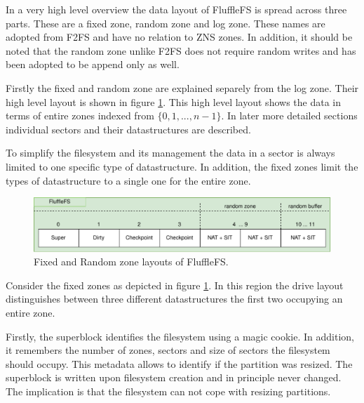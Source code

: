 In a very high level overview the data layout of FluffleFS is spread across
three parts. These are a fixed zone, random zone and log zone. These names are
adopted from F2FS and have no relation to ZNS zones. In addition, it should be
noted that the random zone unlike F2FS does not require random writes and has
been adopted to be append only as well.

Firstly the fixed and random zone are explained separely from the log zone.
Their high level layout is shown in figure \ref{figure:flufflelayout}. This high
level layout shows the data in terms of entire zones indexed from
${\{0,1,...,n-1\}}$. In later more detailed sections individual sectors and
their datastructures are described.

To simplify the filesystem and its management the data in a sector is always
limited to one specific type of datastructure. In addition, the fixed zones
limit the types of datastructure to a single one for the entire zone.

\begin{figure}[h!]
    \centering
	\includegraphics[width=1\textwidth]{resources/images/fluffle-layout.pdf}
	\caption{Fixed and Random zone layouts of FluffleFS.}
    \label{figure:flufflelayout}
\end{figure}

Consider the fixed zones as depicted in figure \ref{figure:flufflelayout}. In
this region the drive layout distinguishes between three different
datastructures the first two occupying an entire zone.

Firstly, the superblock identifies the filesystem using a magic cookie. In
addition, it remembers the number of zones, sectors and size of sectors the
filesystem should occupy. This metadata allows to identify if the partition was
resized. The superblock is written upon filesystem creation and in principle
never changed. The implication is that the filesystem can not cope with resizing
partitions.


